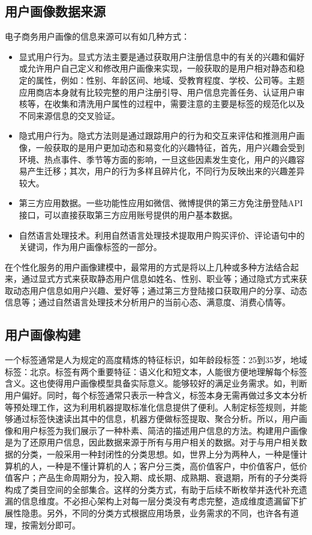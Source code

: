 		\subsection{用户画像数据来源}	    
	    电子商务用户画像的信息来源可以有如几种方式：
	    \begin{itemize}
	    \item 显式用户行为。显式方法主要是通过获取用户注册信息中的有关的兴趣和偏好或允许用户自己定义和修改用户画像来实现，一般获取的是用户相对静态和稳定的属性，例如：性别、年龄区间、地域、受教育程度、学校、公司等。主题应用商店本身就有比较完整的用户注册引导、用户信息完善任务、认证用户审核等，在收集和清洗用户属性的过程中，需要注意的主要是标签的规范化以及不同来源信息的交叉验证。
	    \item 隐式用户行为。隐式方法则是通过跟踪用户的行为和交互来评估和推测用户画像，一般获取的是用户更加动态和易变化的兴趣特征，首先，用户兴趣会受到环境、热点事件、季节等方面的影响，一旦这些因素发生变化，用户的兴趣容易产生迁移；其次，用户的行为多样且碎片化，不同行为反映出来的兴趣差异较大。
	    \item 第三方应用数据。一些功能性应用如微信、微博提供的第三方免注册登陆API接口，可以直接获取第三方应用账号提供的用户基本数据。
	    \item 自然语言处理技术。利用自然语言处理技术提取用户购买评价、评论语句中的关键词，作为用户画像标签的一部分。
	    \end{itemize}

	    在个性化服务的用户画像建模中，最常用的方式是将以上几种或多种方法结合起来，通过显式方式来获取静态用户信息如姓名、性别、职业等；通过隐式方式来获取动态用户信息如用户兴趣、爱好等；通过第三方登陆接口获取用户的分享、动态信息等；通过自然语言处理技术分析用户的当前心态、满意度、消费心情等。

		\subsection{用户画像构建}
		一个标签通常是人为规定的高度精炼的特征标识，如年龄段标签：25到35岁，地域标签：北京。标签有两个重要特征：语义化和短文本，人能很方便地理解每个标签含义。这也使得用户画像模型具备实际意义。能够较好的满足业务需求。如，判断用户偏好。同时，每个标签通常只表示一种含义，标签本身无需再做过多文本分析等预处理工作，这为利用机器提取标准化信息提供了便利。人制定标签规则，并能够通过标签快速读出其中的信息，机器方便做标签提取、聚合分析。所以，用户画像和用户标签为我们展示了一种朴素、简洁的描述用户信息的方法。构建用户画像是为了还原用户信息，因此数据来源于所有与用户相关的数据。对于与用户相关数据的分类，一般采用一种封闭性的分类思想。如，世界上分为两种人，一种是懂计算机的人，一种是不懂计算机的人；客户分三类，高价值客户，中价值客户，低价值客户；产品生命周期分为，投入期、成长期、成熟期、衰退期，所有的子分类将构成了类目空间的全部集合。这样的分类方式，有助于后续不断枚举并迭代补充遗漏的信息维度。不必担心架构上对每一层分类没有考虑完整，造成维度遗漏留下扩展性隐患。另外，不同的分类方式根据应用场景，业务需求的不同，也许各有道理，按需划分即可。

